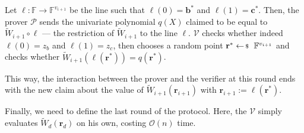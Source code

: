 \documentclass[../../book.tex]{subfiles}
\begin{document}
\begin{proposition}
    Let $\ell: \mathbb{F} \to \mathbb{F}^{v_{i+1}}$ be the line such that
    $\ell(0)=\boldsymbol{b}^*$ and $\ell(1)=\boldsymbol{c}^*$. Then, the prover
    $\mathcal{P}$ sends the univariate polynomial $q(X)$ claimed to be equal to
    $\widetilde{W}_{i+1} \circ \ell$ --- the restriction of
    $\widetilde{W}_{i+1}$ to the line $\ell$. $\mathcal{V}$ checks whether
    indeed $\ell(0)=z_b$ and $\ell(1)=z_c$, then chooses a random point
    $\mathbf{r}^* \leftarrowS \mathbb{F}^{v_{i+1}}$ and checks whether
    $\widetilde{W}_{i+1}(\ell(\mathbf{r}^*)) = q(\mathbf{r}^*)$.
\end{proposition}

This way, the interaction between the prover and the verifier at this round ends
with the new claim about the value of $\widetilde{W}_{i+1}(\mathbf{r}_{i+1})$
with $\mathbf{r}_{i+1} := \ell(\mathbf{r}^*)$.

Finally, we need to define the last round of the protocol. Here, 
the $\mathcal{V}$ simply evaluates $\widetilde{W}_d(\mathbf{r}_d)$
on his own, costing $\mathcal{O}(n)$ time. 
\end{document}
